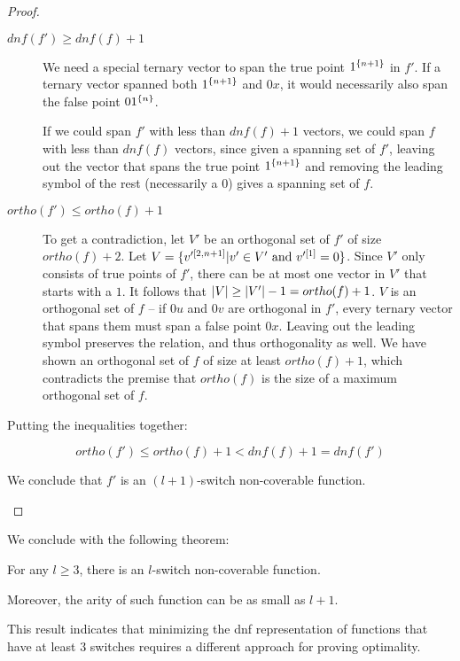 \begin{proof}
\begin{enumerate}
\begin{description}
\item[$dnf(f') \geq dnf(f) + 1$]
We need a special ternary vector to span the true point
$1^{\{n+1\}}$ in $f'$.
If a ternary vector spanned both $1^{\{n+1\}}$
and $0 x$,
it would necessarily also span the false point
$0 1^{\{n\}}$.

If we could span $f'$ with less than $dnf(f) + 1$ vectors,
we could span $f$ with less than $dnf(f)$ vectors,
since given a spanning set of $f'$,
leaving out the vector
that spans the true point $1^{\{n+1\}}$
and removing the leading symbol of the rest
(necessarily a $0$)
gives a spanning set of $f$.

\item[$ortho(f') \leq ortho(f) + 1$]
To get a contradiction,
let $V'$ be an orthogonal set of $f'$
of size $ortho(f) + 2$.
Let $V = \{v'^{[2, n+1]} | v' \in V'
\text{ and } v'^{[1]} = 0\}$.
Since $V'$ only consists of true points of $f'$,
there can be at most one vector in $V'$
that starts with a $1$.
It follows that
$\lvert V\rvert \geq \lvert V'\rvert - 1 = ortho(f) + 1$.
$V$ is an orthogonal set of $f$ --
if $0 u$ and $0 v$ are orthogonal in $f'$,
every ternary vector that spans them must span
a false point $0 x$.
Leaving out the leading symbol preserves the relation,
and thus orthogonality as well.
We have shown an orthogonal set of $f$ of size at least
$ortho(f) + 1$,
which contradicts the premise that $ortho(f)$ is the size
of a maximum orthogonal set of $f$.
\end{description}

Putting the inequalities together:

\[
ortho(f') \leq ortho(f) + 1 < dnf(f) + 1 = dnf(f')
\]

We conclude that $f'$ is an $(l+1)$-switch non-coverable
function.
\end{enumerate}
\end{proof}

We conclude with the following theorem:

\begin{theorem}
For any $l \geq 3$,
there is an $l$-switch non-coverable function.

Moreover, the arity of such function can be as small as
$l+1$.
\end{theorem}

This result indicates that minimizing the \acrshort{dnf}
representation of functions that have at least $3$ switches
requires a different approach for proving optimality.
